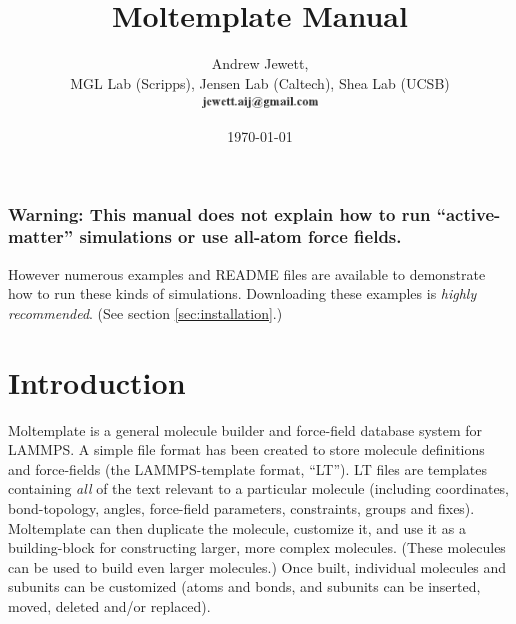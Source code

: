 \documentclass[11pt]{article}
\begin{document}
\author{
  Andrew Jewett, \\
  MGL Lab (Scripps), Jensen Lab (Caltech), Shea Lab (UCSB) \\
\includegraphics[height=0.3cm]{author_email.png}
}
\date \today


\title{Moltemplate Manual}



\maketitle


\tableofcontents


\subsubsection*{Warning: This manual does not explain how to run ``active-matter'' simulations or use all-atom force fields.}
However numerous examples and README files are available to
demonstrate how to run these kinds of simulations.
Downloading these examples is \textit{highly recommended}.
(See section \ref{sec:installation}.)

\section{Introduction}



Moltemplate is a general molecule builder and force-field database system for LAMMPS.  A simple file format has been created to store molecule definitions and force-fields (the LAMMPS-template format, “LT”). 
LT files are templates containing \textit{all} of the text relevant to a particular molecule (including coordinates, bond-topology, angles, force-field parameters, constraints, groups and fixes).  Moltemplate can then duplicate the molecule, customize it, and use it as a building-block for constructing larger, more complex molecules.  (These molecules can be used to build even larger molecules.)  Once built, individual molecules and subunits can be customized (atoms and bonds, and subunits can be inserted, moved, deleted and/or replaced).
\end{document}
